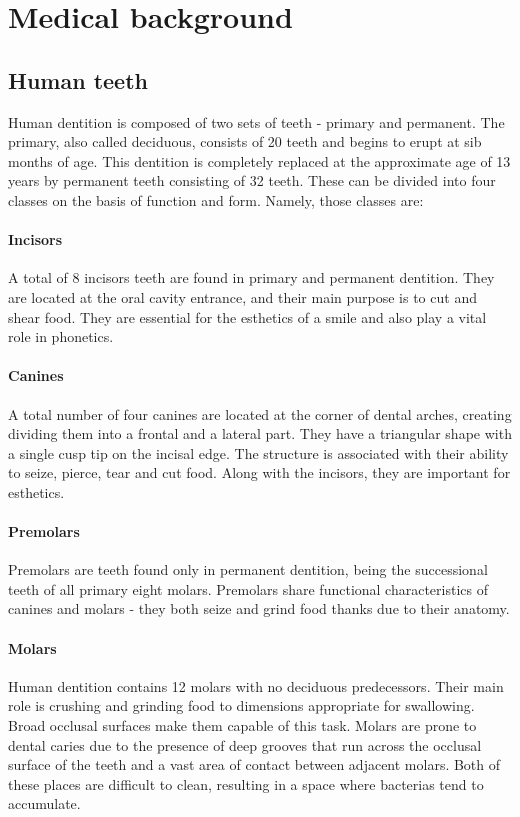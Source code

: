 \chapter{Medical background}
\label{chapter:medical_background}

\section{Human teeth}
Human dentition is composed of two sets of teeth - primary and permanent. The primary, also called deciduous, consists of 20 teeth and begins to erupt at sib months of age. This dentition is completely replaced at the approximate age of 13 years by permanent teeth consisting of 32 teeth. These can be divided into four classes on the basis of function and form. Namely, those classes are:

\subsubsection*{Incisors}
A total of 8 incisors teeth are found in primary and permanent dentition. They are located at the oral cavity entrance, and their main purpose is to cut and shear food. They are essential for the esthetics of a smile and also play a vital role in phonetics.

\subsubsection*{Canines}
A total number of four canines are located at the corner of dental arches, creating dividing them into a frontal and a lateral part. They have a triangular shape with a single cusp tip on the incisal edge. The structure is associated with their ability to seize, pierce, tear and cut food. Along with the incisors, they are important for esthetics.

\subsubsection*{Premolars}
Premolars are teeth found only in permanent dentition, being the successional teeth of all primary eight molars. Premolars share functional characteristics of canines and molars - they both seize and grind food thanks due to their anatomy.

\subsubsection*{Molars}
Human dentition contains 12 molars with no deciduous predecessors. Their main role is crushing and grinding food to dimensions appropriate for swallowing. Broad occlusal surfaces make them capable of this task. Molars are prone to dental caries due to the presence of deep grooves that run across the occlusal surface of the teeth and a vast area of contact between adjacent molars. Both of these places are difficult to clean, resulting in a space where bacterias tend to accumulate.


